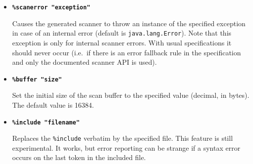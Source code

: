 \documentclass[11pt]{scrartcl}
\begin{document}
\begin{itemize}
\item 
{\bfseries \texttt{\%scanerror "exception"}}

Causes the generated scanner to throw an instance of the specified
exception in case of an internal error (default is
\texttt{java.lang.Error}).  Note that this exception is only for
internal scanner errors. With usual specifications it should never
occur (i.e.~if there is an error fallback rule in the specification
and only the documented scanner API is used).

\item
{\bfseries \texttt{\%buffer "size"}}

Set the initial size of the scan buffer to the specified value 
(decimal, in bytes). The default value is 16384.

\item 
{\bfseries \texttt{\%include "filename"}}

Replaces the \texttt{\%include} verbatim by the specified file. This
feature is still experimental. It works, but error reporting can be
strange if a syntax error occurs on the last token in the included
file.

\end{itemize}
\end{document}
